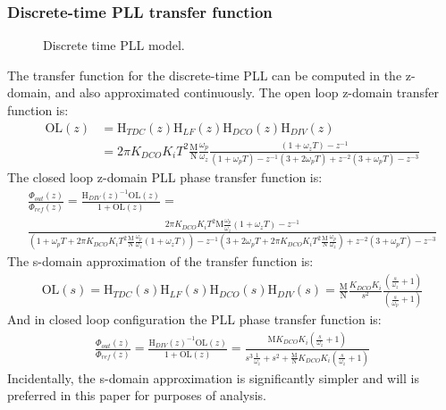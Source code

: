 	\subsubsection{Discrete-time PLL transfer function}
		\begin{figure}[htb!]
			\center
			\caption{Discrete time PLL model.}
			\label{fig:discrete_pll2}
		\end{figure}
		\FloatBarrier
		The transfer function for the discrete-time PLL can be computed in the z-domain, and also approximated continuously. The open loop z-domain transfer function is:
		\begin{align}
			\mathrm{OL}(z) &= \mathrm{H}_{TDC}(z)\mathrm{H}_{LF}(z)\mathrm{H}_{DCO}(z)\mathrm{H}_{DIV}(z) \\
			&= 2\pi K_{DCO}K_iT^2\frac{\mathrm{M}}{\mathrm{N}}\frac{\omega_p}{\omega_z}\frac{(1+\omega_zT)-z^{-1}}{(1+\omega_pT) - z^{-1}(3+2\omega_pT) + z^{-2}(3+\omega_pT) - z^{-3}}\label{eq:z_open_loop}
		\end{align}
		The closed loop z-domain PLL phase transfer function is:
		\begin{align}
			\frac{\Phi_{out}(z)}{\Phi_{ref}(z)} = \frac{\mathrm{H}_{DIV}(z)^{-1}\mathrm{OL}(z)}{1+\mathrm{OL}(z)} = \\
			\frac{2\pi K_{DCO}K_iT^2\mathrm{M}\frac{\omega_p}{\omega_z}(1+\omega_zT)-z^{-1}}{(1+\omega_pT + 2\pi K_{DCO}K_iT^2\frac{\mathrm{M}}{\mathrm{N}}\frac{\omega_p}{\omega_z}(1+\omega_zT))- z^{-1}(3+2\omega_pT+2\pi K_{DCO}K_iT^2\frac{\mathrm{M}}{\mathrm{N}}\frac{\omega_p}{\omega_z})+ z^{-2}(3+\omega_pT) - z^{-3}}
		\end{align}
		The s-domain approximation of the transfer function is:
		\begin{align}
			\mathrm{OL}(s) = \mathrm{H}_{TDC}(s)\mathrm{H}_{LF}(s)\mathrm{H}_{DCO}(s)\mathrm{H}_{DIV}(s) = \frac{\mathrm{M}}{\mathrm{N}}\frac{K_{DCO}K_i}{s^2} \frac{\left(\frac{s}{\omega_z} + 1\right)}{\left(\frac{s}{\omega_p} + 1\right)}
		\end{align}
		And in closed loop configuration the PLL phase transfer function is:
		\begin{align}
			\frac{\Phi_{out}(z)}{\Phi_{ref}(z)} = \frac{\mathrm{H}_{DIV}(z)^{-1}\mathrm{OL}(z)}{1+\mathrm{OL}(z)} = \frac{\mathrm{M}K_{DCO}K_i\left(\frac{s}{\omega_z} + 1\right)}{s^3\frac{1}{\omega_z} + s^2 + \frac{\mathrm{M}}{\mathrm{N}}K_{DCO}K_i\left(\frac{s}{\omega_z} + 1\right)}
		\end{align}
		Incidentally, the s-domain approximation is significantly simpler and will is preferred in this paper for purposes of analysis.


